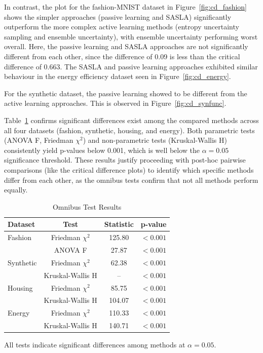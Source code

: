 \documentclass[10pt, conference]{IEEEtran}
\begin{document}
In contrast, the plot for the fashion-MNIST dataset in Figure~\ref{fig:cd_fashion} shows the simpler approaches (passive learning and SASLA) significantly outperform the more complex active learning methods (entropy uncertainty sampling and ensemble uncertainty), with ensemble uncertainty performing worst overall. Here, the passive learning and SASLA approaches are not significantly different from each other, since the difference of 0.09 is less than the critical difference of 0.663. The SASLA and passive learning approaches exhibited similar behaviour in the energy efficiency dataset seen in Figure~\ref{fig:cd_energy}. 

For the synthetic dataset, the passive learning showed to be different from the active learning approaches. This is observed in Figure~\ref{fig:cd_synfunc}.

Table~\ref{tab:omnibus} confirms significant differences exist among the compared methods across all four datasets (fashion, synthetic, housing, and energy). Both parametric tests (ANOVA F, Friedman $\chi^2$) and non-parametric tests (Kruskal-Wallis H) consistently yield p-values below 0.001, which is well below the $\alpha = 0.05$ significance threshold. These results justify proceeding with post-hoc pairwise comparisons (like the critical difference plots) to identify which specific methods differ from each other, as the omnibus tests confirm that not all methods perform equally.

\begin{table}[htbp]
	\caption{Omnibus Test Results}
	\label{tab:omnibus}
	\centering
	\small
	\begin{tabular}{lccc}
		\hline
		\textbf{Dataset} & \textbf{Test} & \textbf{Statistic} & \textbf{p-value} \\
		\hline
		Fashion   & Friedman $\chi^2$     & 125.80 & $<0.001$ \\
		& ANOVA F               & 27.87  & $<0.001$ \\
		\hline
		Synthetic & Friedman $\chi^2$     & 62.38  & $<0.001$ \\
		& Kruskal-Wallis H      & --     & $<0.001$ \\
		\hline
		Housing   & Friedman $\chi^2$     & 85.75  & $<0.001$ \\
		& Kruskal-Wallis H      & 104.07 & $<0.001$ \\
		\hline
		Energy    & Friedman $\chi^2$     & 110.33 & $<0.001$ \\
		& Kruskal-Wallis H      & 140.71 & $<0.001$ \\
		\hline
	\end{tabular}
	\begin{flushleft}
		\footnotesize All tests indicate significant differences among methods at $\alpha = 0.05$.
	\end{flushleft}
\end{table}
\end{document}
